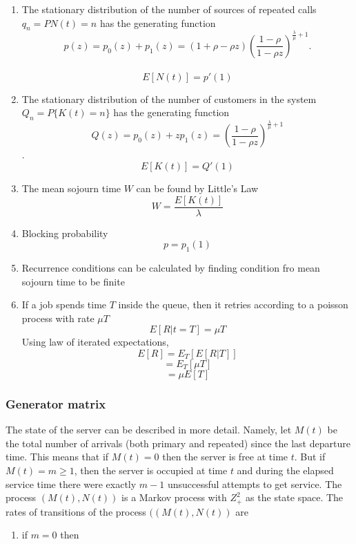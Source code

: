 \documentclass[10pt]{article}
\begin{document}
\begin{enumerate}[label=(\alph*)]
    \item 
 The stationary distribution of the number of sources of repeated calls  $q_{n}={P{N(t)=n}}$ has the generating function
$$p(z)=p_{0}(z)+p_{1}(z)=(1+\rho-\rho z)(\frac{1-\rho}{1-\rho z})^{\frac{\lambda}{\mu}+1}.$$ \\ 
$$E[N(t)]=p'(1)$$

\item The stationary distribution of the number of customers in the system $Q_{n}=P\{K(t)=n\}$  has the generating function \\ 
$$Q(z)=p_{0}(z)+zp_{1}(z)=(\frac{1-\rho}{1-\rho z})^{\frac{\lambda}{\mu}+1}$$.
$$E[K(t)]=Q'(1)$$

\item The mean sojourn time $W$ can be found by Little's Law
$$W=\frac{E[K(t)]}{\lambda}$$

\item Blocking probability 
$$p=p_1(1)$$

\item Recurrence conditions can be calculated by finding condition fro mean sojourn time to be finite

\item If a job spends time $T$ inside the queue, then it retries according to a poisson process with rate $\mu T$
\[E[R|t=T]=\mu T\]
Using law of iterated expectations, 
\[E[R]=E_T[E[R|T]]\]
\[=E_T[\mu T]\]
\[=\mu E[T]\]

\end{enumerate}

\subsubsection{Generator matrix}
The state of the server can be described in more detail. Namely, let $M(t)$ be the total number of arrivals (both primary and repeated) since the last departure time. This means that if $M(t)=0$ then the server is free at time $t$. But if $M(t)=m \geq 1$, then the server is occupied at time $t$ and during the elapsed service time there were exactly $m-1$ unsuccessful attempts to get service. The process $(M(t), N(t))$ is a Markov process with $Z_{+}^{2}$ as the state space. The rates of transitions of the process $((M(t), N(t))$ are

\begin{enumerate}
  \item if $m=0$ then
\end{enumerate}
\end{document}
